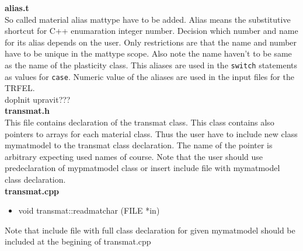 {\bf alias.t}\\
So called material alias {\sf mattype} have to be added. Alias means the substitutive shortcut
for C++ enumaration integer number. Decision which number and name for its alias depends on the user.
Only restrictions are that the name and number have to be unique in the {\sf mattype} scope. Also note
the name haven't to be same as the name of the plasticity class. This aliases are used in the
{\tt switch} statements as values for {\tt case}. Numeric value of the aliases are used in the input
files for the TRFEL.\\

doplnit upravit???\\


{\bf transmat.h}\\
This file contains declaration of the {\sf transmat} class. This class contains also pointers to arrays for each
material class. Thus the user have to include new class {\sf mymatmodel} to the {\sf transmat} class declaration.
The name of the pointer is arbitrary expecting used names of course. Note that the user should use predeclaration
of {\sf mypmatmodel} class or insert include file with {\sf mymatmodel} class declaration.\\

{\bf transmat.cpp}
\begin{itemize}
\item {\sf void transmat::readmatchar (FILE *in)}
\end{itemize}
Note that include file with full class declaration for given {\sf mymatmodel} should be included at the begining
of transmat.cpp\\

